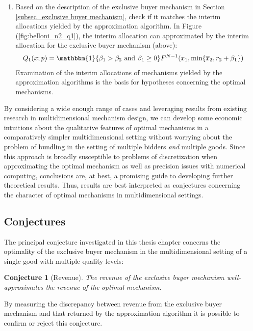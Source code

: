 \documentclass{article}
\newtheorem{conjecture}{Conjecture}
\newcounter{fig}
\begin{document}
\begin{enumerate}
    \item Based on the description of the exclusive buyer mechanism in Section \ref{subsec_exclusive buyer mechanism}, check if it matches the interim allocations yielded by the approximation algorithm. In Figure (\ref{fig:belloni_n2_q1}), the interim allocation can approximated by the interim allocation for the exclusive buyer mechanism (above): 
    \begin{equation}
        Q_1(x;p) = \mathbbm{1}\{ \beta_1 > \beta_2 \text{ and } \beta_1 \geq 0 \}F^{N-1}(x_1, \min\{\overline{x}_2, r_2 + \beta_1\})
    \end{equation}
    \noindent Examination of the interim allocations of mechanisms yielded by the approximation algorithms is the basis for hypotheses concerning the optimal mechanisms.
\end{enumerate}

\noindent By considering a wide enough range of cases and leveraging results from existing research in multidimensional mechanism design, we can develop some economic intuitions about the qualitative features of optimal mechanisms in a comparatively simpler multidimensional setting without worrying about the problem of bundling in the setting of multiple bidders \textit{and} multiple goods. Since this approach is broadly susceptible to problems of discretization when approximating the optimal mechanism as well as precision issues with numerical computing, conclusions are, at best, a promising guide to developing further theoretical results. Thus, results are best interpreted as conjectures concerning the character of optimal mechanisms in multidimensional settings.




\subsection{Conjectures}\label{subsec_conj}

The principal conjecture investigated in this thesis chapter concerns the optimality of the exclusive buyer mechanism in the multidimensional setting of a single good with multiple quality levels:

\begin{conjecture}[Revenue]\label{conj_rev}
The revenue of the exclusive buyer mechanism well-approximates the revenue of the optimal mechanism.
\end{conjecture}

\noindent By measuring the discrepancy between revenue from the exclusive buyer mechanism and that returned by the approximation algorithm it is possible to confirm or reject this conjecture. 
\end{document}
